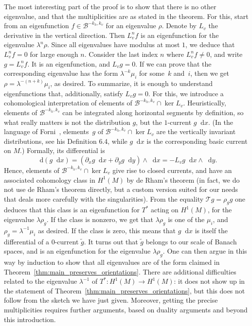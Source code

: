 \documentclass[JEP,XML,SOM,Unicode]{cedram}
\newcommand{\boB}{\mathcal{B}}
\newcommand{\boT}{\mathcal{T}}
\newcommand{\dd}{\mathop{}\!\mathrm{d}}
\theoremstyle{definition}
\numberwithin{equation}{section}
\begin{document}
The most interesting part of the proof is to show that there is no other
eigenvalue, and that the multiplicities are as stated in the theorem. For
this, start from an eigenfunction $f \in \boB^{-k_h, k_v}$ for an eigenvalue
$\rho$. Denote by $L_v$ the derivative in the vertical direction. Then $L_v^n
f$ is an eigenfunction for the eigenvalue $\lambda^n \rho$. Since all
eigenvalues have modulus at most $1$, we deduce that $L_v^n f = 0$ for large
enough $n$. Consider the last index $n$ where $L_v^n f \neq 0$, and write $g
= L_v^n f$. It is an eigenfunction, and $L_v g = 0$. If we can prove that the
corresponding eigenvalue has the form $\lambda^{-k} \mu_i$ for some~$k$ and~$i$, then we get $\rho = \lambda^{-(n+k)} \mu_i$, as desired. To summarize,
it is enough to understand eigenfunctions that, additionally, satisfy $L_v g
= 0$. For this, we introduce a cohomological interpretation of elements of
$\boB^{-k_h, k_v} \cap \ker L_v$. Heuristically, elements of $\boB^{-k_h,
k_v}$ can be integrated along horizontal segments by definition, so what
really matters is not the distribution $g$, but the $1$-current $g\dd x$. (In
the language of Forni~\cite{forni_deviation}, elements~$g$ of $\boB^{-k_h,
k_v} \cap \ker L_v$ are the vertically invariant distributions, see his
Definition 6.4, while $g\dd x$ is the corresponding basic current on $M$.)
Formally, its differential is
\begin{equation*}
\dd(g\dd x) =
(\partial_x g \dd x + \partial_y g \dd y) \wedge \dd x
= - L_v g \dd x \wedge \dd y.
\end{equation*}
Hence, elements of $\boB^{-k_h, k_v} \cap \ker L_v$ give rise to closed
currents, and have an associated cohomology class in $H^1(M)$ by de Rham's
theorem (in fact, we do not use de Rham's theorem directly, but a custom
version suited for our needs that deals more carefully with the
singularities). From the equality $\boT g = \rho_g g$ one deduces that this
class is an eigenfunction for $T^*$ acting on $H^1(M)$, for the eigenvalue
$\lambda \rho_g$. If the class is nonzero, we get that $\lambda \rho_g$ is
one of the $\mu_i$, and $\rho_g = \lambda^{-1} \mu_i$ as desired. If the
class is zero, this means that $g \dd x$ is itself the differential of a
$0$-current $\tilde g$. It turns out that $\tilde g$ belongs to our scale of
Banach spaces, and is an eigenfunction for the eigenvalue $\lambda \rho_g$.
One can then argue in this way by induction to show that all eigenvalues are
of the form claimed in Theorem~\ref{thm:main_preserves_orientations}. There
are additional difficulties related to the eigenvalue $\lambda^{-1}$ of $T^*
: H^1(M)\to H^1(M)$: it does not show up in the statement of
Theorem~\ref{thm:main_preserves_orientations}, but this does not follow from
the sketch we have just given. Moreover, getting the precise multiplicities
requires further arguments, based on duality arguments and beyond this
introduction.
\end{document}
